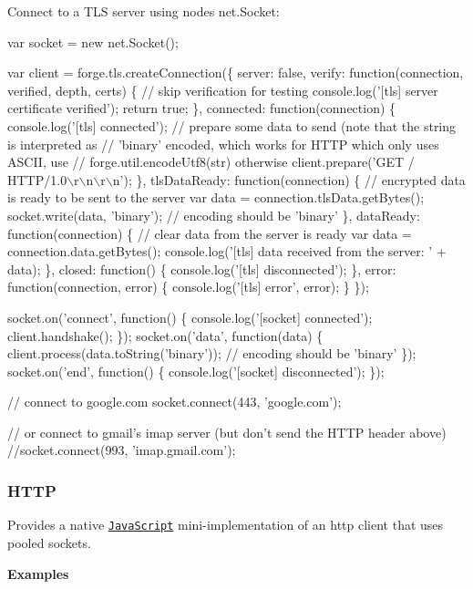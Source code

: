 Connect to a T\+LS server using node\textquotesingle{}s net.\+Socket\+:


\begin{DoxyCode}
var socket = new net.Socket();

var client = forge.tls.createConnection(\{
  server: false,
  verify: function(connection, verified, depth, certs) \{
    // skip verification for testing
    console.log('[tls] server certificate verified');
    return true;
  \},
  connected: function(connection) \{
    console.log('[tls] connected');
    // prepare some data to send (note that the string is interpreted as
    // 'binary' encoded, which works for HTTP which only uses ASCII, use
    // forge.util.encodeUtf8(str) otherwise
    client.prepare('GET / HTTP/1.0\(\backslash\)r\(\backslash\)n\(\backslash\)r\(\backslash\)n');
  \},
  tlsDataReady: function(connection) \{
    // encrypted data is ready to be sent to the server
    var data = connection.tlsData.getBytes();
    socket.write(data, 'binary'); // encoding should be 'binary'
  \},
  dataReady: function(connection) \{
    // clear data from the server is ready
    var data = connection.data.getBytes();
    console.log('[tls] data received from the server: ' + data);
  \},
  closed: function() \{
    console.log('[tls] disconnected');
  \},
  error: function(connection, error) \{
    console.log('[tls] error', error);
  \}
\});

socket.on('connect', function() \{
  console.log('[socket] connected');
  client.handshake();
\});
socket.on('data', function(data) \{
  client.process(data.toString('binary')); // encoding should be 'binary'
\});
socket.on('end', function() \{
  console.log('[socket] disconnected');
\});

// connect to google.com
socket.connect(443, 'google.com');

// or connect to gmail's imap server (but don't send the HTTP header above)
//socket.connect(993, 'imap.gmail.com');
\end{DoxyCode}


\label{_http}%
 \subsubsection*{H\+T\+TP}

Provides a native \href{http://en.wikipedia.org/wiki/JavaScript}{\tt Java\+Script} mini-\/implementation of an http client that uses pooled sockets.

{\bfseries Examples}


